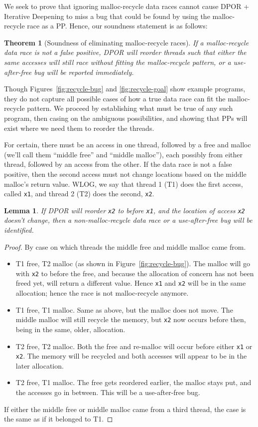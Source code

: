 \documentclass[pldi]{sigplanconf-pldi15}
\newtheorem{lemma}{Lemma}
\newtheorem{theorem}{Theorem}
\begin{document}
We seek to prove that ignoring malloc-recycle data races cannot cause DPOR + Iterative Deepening to miss a bug that could be found by using the malloc-recycle race as a PP. Hence, our soundness statement is as follows:

\begin{theorem}[Soundness of eliminating malloc-recycle races]
	If a malloc-recycle data race is not a false positive, DPOR will reorder threads such that either the same accesses will still race without fitting the malloc-recycle pattern, or a use-after-free bug will be reported immediately.
\end{theorem}

Though Figures~\ref{fig:recycle-bug} and \ref{fig:recycle-goal} show example programs, they do not capture all possible cases of how a true data race can fit the malloc-recycle pattern.
We proceed by establishing what must be true of any such program, then casing on the ambiguous possibilities, and showing that PPs will exist where we need them to reorder the threads.

For certain, there must be an access in one thread, followed by a free and malloc (we'll call them ``middle free'' and ``middle malloc''), each possibly from either thread, followed by an access from the other.
If the data race is not a false positive, then the second access must not change locations based on the middle malloc's return value.
WLOG, we say that thread 1 (T1) does the first access, called {\tt x1}, and thread 2 (T2) does the second, {\tt x2}.

\begin{lemma}
	If DPOR will reorder {\tt x2} to before {\tt x1}, and the location of access {\tt x2} doesn't change,
	then a non-malloc-recycle data race or a use-after-free bug will be identified.
	\label{lem:reorder}
\end{lemma}
\begin{proof}
By case on which threads the middle free and middle malloc came from.
\begin{itemize}
	\item T1 free, T2 malloc (as shown in Figure~\ref{fig:recycle-bug}). The malloc will go with {\tt x2} to before the free, and because the allocation of concern has not been freed yet, will return a different value. Hence {\tt x1} and {\tt x2} will be in the same allocation; hence the race is not malloc-recycle anymore.
	\item T1 free, T1 malloc. Same as above, but the malloc does not move. The middle malloc will still recycle the memory, but {\tt x2} now occurs before then, being in the same, older, allocation.
	\item T2 free, T2 malloc. Both the free and re-malloc will occur before either {\tt x1} or {\tt x2}. The memory will be recycled and both accesses will appear to be in the later allocation.
	\item T2 free, T1 malloc. The free gets reordered earlier, the malloc stays put, and the accesses go in between. This will be a use-after-free bug.
\end{itemize}
If either the middle free or middle malloc came from a third thread, the case is the same as if it belonged to T1.
\end{proof}
\end{document}
